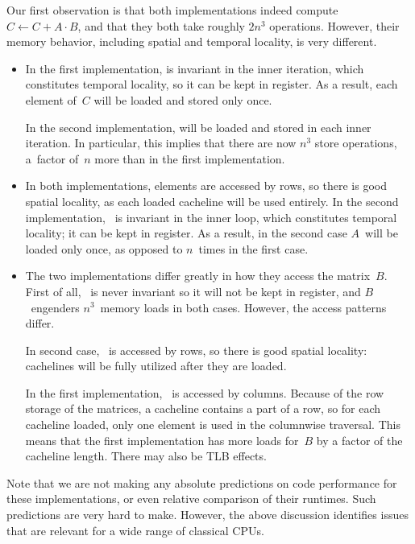 Our first observation is that both implementations
indeed compute $C\leftarrow
C+A\cdot B$, and that they both take roughly $2n^3$
operations. However, their memory behavior, including spatial and
temporal locality, is very different.
\begin{itemize}
\item[\n{c[i,j]}] In the first implementation,  is
  invariant in the inner iteration, which constitutes temporal
  locality,
  so it can be kept in register. As
  a result, each element of~$C$ will be loaded and stored only once.

  In the second implementation,  will be loaded and stored
  in each inner iteration. In particular, this implies that there are
  now $n^3$ store operations, a~factor of~$n$ more than in the first
  implementation.
\item[\n{a[i,k]}] In both implementations,  elements are
  accessed by rows, so there is good spatial locality, as each loaded
  cacheline will be used entirely. In the second implementation,
  ~is invariant in the inner loop, which constitutes
  temporal locality; it can be kept in register. As a result, in the
  second case $A$~will be loaded only once, as opposed to $n$~times in
  the first case.
\item[\n{b[k,j]}] The two implementations differ greatly in how they
  access the matrix~$B$. First of all, ~is never invariant
  so it will not be kept in register, and $B$~engenders $n^3$~memory
  loads in both cases. However, the access patterns differ.

  In second case, ~is accessed by rows,
  so there is good spatial locality: cachelines will be fully utilized
  after they are loaded. 

  In the first implementation, ~is accessed by
  columns. Because of the row storage of the matrices, a cacheline contains
  a part of a row, so for each cacheline loaded, only one element is
  used in the columnwise traversal. This means that the first
  implementation has more loads for~$B$ by a factor of the cacheline
  length. There may also be TLB effects.
\end{itemize}
Note that we are not making any absolute predictions on code
performance for these implementations, or even relative comparison of
their runtimes. Such predictions are very hard to make. However, the
above discussion identifies issues that are relevant for a wide range
of classical \acp{CPU}.

